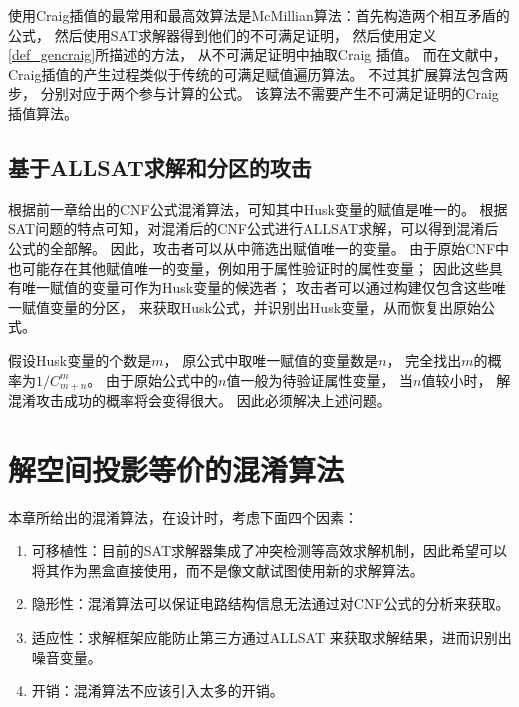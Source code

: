 使用Craig插值的最常用和最高效算法是McMillian算法：首先构造两个相互矛盾的公式，
然后使用SAT求解器得到他们的不可满足证明，
然后使用定义\ref{def_gencraig}所描述的方法，
从不可满足证明中抽取Craig 插值。
而在文献中，
Craig插值的产生过程类似于传统的可满足赋值遍历算法。
不过其扩展算法包含两步，
分别对应于两个参与计算的公式。
该算法不需要产生不可满足证明的Craig插值算法。

\subsection{基于ALLSAT求解和分区的攻击}
根据前一章给出的CNF公式混淆算法，可知其中Husk变量的赋值是唯一的。
根据SAT问题的特点可知，对混淆后的CNF公式进行ALLSAT求解，可以得到混淆后公式的全部解。
因此，攻击者可以从中筛选出赋值唯一的变量。
由于原始CNF中也可能存在其他赋值唯一的变量，例如用于属性验证时的属性变量；
因此这些具有唯一赋值的变量可作为Husk变量的候选者；
攻击者可以通过构建仅包含这些唯一赋值变量的分区，
来获取Husk公式，并识别出Husk变量，从而恢复出原始公式。

假设Husk变量的个数是$m$，
原公式中取唯一赋值的变量数是$n$，
完全找出$m$的概率为$1/{C_{m+n}^m}$。	
由于原始公式中的$n$值一般为待验证属性变量，
当$n$值较小时，
解混淆攻击成功的概率将会变得很大。
因此必须解决上述问题。



\section{解空间投影等价的混淆算法}
本章所给出的混淆算法，在设计时，考虑下面四个因素：

\begin{enumerate}
 \item
可移植性：目前的SAT求解器集成了冲突检测等高效求解机制，因此希望可以将其作为黑盒直接使用，而不是像文献试图使用新的求解算法。
 \item \label{4:g2}
隐形性：混淆算法可以保证电路结构信息无法通过对CNF公式的分析来获取。
\item \label{4:g3}
适应性：求解框架应能防止第三方通过ALLSAT 来获取求解结果，进而识别出噪音变量。
 \item
开销：混淆算法不应该引入太多的开销。
\end{enumerate}

